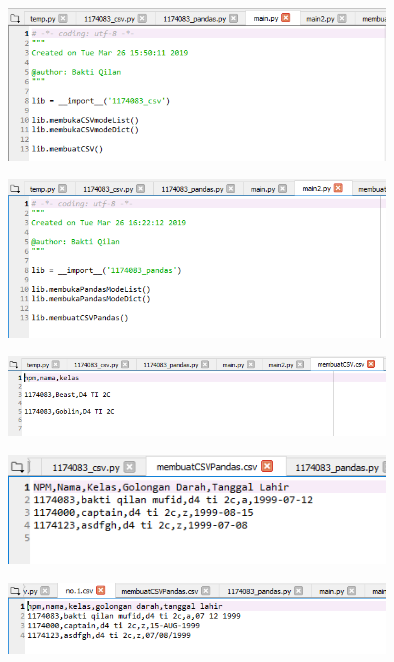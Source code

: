 \begin{figure}[H]
	\includegraphics[width=10cm]{figures/4/1174083/Praktek/kode_praktek_3.png}
	\centering
\end{figure}

\begin{figure}[H]
	\includegraphics[width=10cm]{figures/4/1174083/Praktek/kode_praktek_4.png}
	\centering
\end{figure}

\begin{figure}[H]
	\includegraphics[width=10cm]{figures/4/1174083/Praktek/kode_praktek_5.png}
	\centering
\end{figure}

\begin{figure}[H]
	\includegraphics[width=10cm]{figures/4/1174083/Praktek/kode_praktek_6.png}
	\centering
\end{figure}

\begin{figure}[H]
	\includegraphics[width=10cm]{figures/4/1174083/Praktek/kode_praktek_7.png}
	\centering
\end{figure}